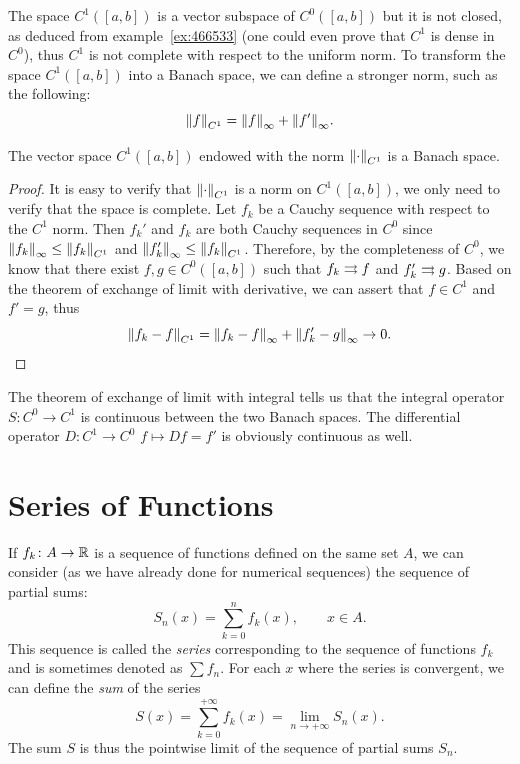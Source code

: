 The space $C^1([a,b])$ is a vector subspace of $C^0([a,b])$ but it is not
closed, as deduced from example~\ref{ex:466533} (one could even prove that $C^1$
is dense in $C^0$), thus $C^1$ is not complete with respect to the uniform norm.
To transform the space $C^1([a,b])$ into a Banach space, we can define a
stronger norm, such as the following:
\[
  {\left\Vert f\right\Vert}_{C^1} = {\left\Vert f\right\Vert}_\infty + {\left\Vert f'\right\Vert}_\infty.
\]
\begin{theorem}
\mymark{*}
The vector space $C^1([a,b])$ endowed with the norm ${\left\Vert \cdot\right\Vert}_{C^1}$ is a
Banach space.
\end{theorem}
%
\begin{proof}
It is easy to verify that ${\left\Vert \cdot\right\Vert}_{C^1}$ is a norm on $C^1([a,b])$, we only
need to verify that the space is complete. Let $f_k$ be a Cauchy sequence with
respect to the $C^1$ norm. Then $f_k'$ and $f_k$ are both Cauchy sequences in
$C^0$ since ${\left\Vert f_k\right\Vert}_\infty \le {\left\Vert f_k\right\Vert}_{C^1}$ and ${\left\Vert f_k'\right\Vert}_\infty \le
{\left\Vert f_k\right\Vert}_{C^1}$. Therefore, by the completeness of $C^0$, we know that there
exist $f,g\in C^0([a,b])$ such that $f_k\rightrightarrows f$ and $f_k'\rightrightarrows g$. Based on the
theorem of exchange of limit with derivative, we can assert that $f\in C^1$ and
$f'=g$, thus
\[
  {\left\Vert f_k-f\right\Vert}_{C^1} = {\left\Vert f_k-f\right\Vert}_\infty + {\left\Vert f_k'-g\right\Vert}_\infty \to 0.
\]
\end{proof}

The theorem of exchange of limit with integral tells us that the integral
operator $S\colon C^0 \to C^1$ is continuous between the two Banach spaces. The
differential operator $D\colon C^1 \to C^0$ $f\mapsto Df = f'$ is obviously
continuous as well.

\section{Series of Functions}

If $f_k\colon A \to {\mathbb R}$ is a sequence of functions defined on the same set $A$,
we can consider (as we have already done for numerical sequences) the sequence
of partial sums:
\[
  S_n(x) = \sum_{k=0}^n f_k(x), \qquad x\in A.
\]
This sequence is called the \emph{series} corresponding to the sequence of
functions $f_k$ and is sometimes denoted as $\sum f_n$. For each $x$ where the
series is convergent, we can define the \emph{sum}%
 of the series
\[
  S(x) = \sum_{k=0}^{+\infty} f_k(x) = \lim_{n\to +\infty} S_n(x).
\]
The sum $S$ is thus the pointwise limit of the sequence of partial sums $S_n$.

